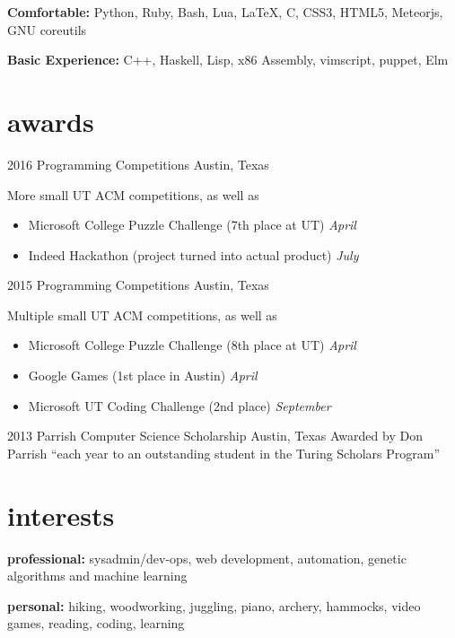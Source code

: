 \documentclass{friggeri-cv}
\begin{document}
\textbf{Comfortable:} Python, Ruby, Bash, Lua, LaTeX, C, CSS3, HTML5, Meteorjs, GNU coreutils
\vspace{-0.15cm}

\textbf{Basic Experience:} C++, Haskell, Lisp, x86 Assembly, vimscript, puppet, Elm

\section{awards}
\begin{entrylist}
\entry%
{2016}
{Programming Competitions}
{Austin, Texas}
{More small UT ACM competitions, as well as
\begin{itemize}
    \item Microsoft College Puzzle Challenge (7th place at UT) \emph{April}
    \item Indeed Hackathon (project turned into actual product) \emph{July}
\end{itemize}}
\entry%
{2015}
{Programming Competitions}
{Austin, Texas}
{Multiple small UT ACM competitions, as well as
\begin{itemize}
    \item Microsoft College Puzzle Challenge (8th place at UT) \emph{April}
    \item Google Games (1st place in Austin) \emph{April}
    \item Microsoft UT Coding Challenge (2nd place) \emph{September}
\end{itemize}}

\entry%
{2013}
{Parrish Computer Science Scholarship}
{Austin, Texas}
{Awarded by Don Parrish ``each year to an outstanding student in the Turing
Scholars Program''}

\end{entrylist}
\vspace{-0.3cm}
\section{interests}
\textbf{professional:} sysadmin/dev-ops, web development, automation, genetic algorithms and machine learning

\textbf{personal:} hiking, woodworking, juggling, piano, archery, hammocks, video games, reading, coding, learning
\end{document}
